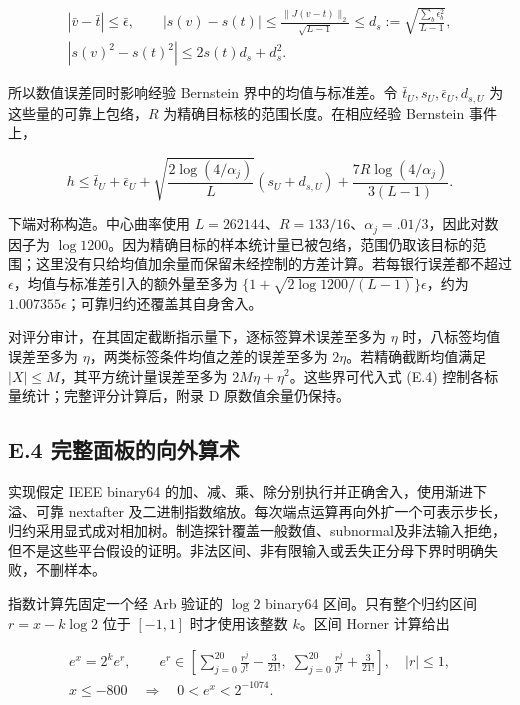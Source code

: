 \documentclass[11pt,a4paper]{article}
\begin{document}
\[
\begin{gathered}
|\bar v-\bar t|\le\bar\epsilon,\qquad
|s(v)-s(t)|\le\frac{\|J(v-t)\|_2}{\sqrt{L-1}}
\le d_s:=\sqrt{\frac{\sum_b\epsilon_b^2}{L-1}},\\
|s(v)^2-s(t)^2|\le2s(t)d_s+d_s^2.
\end{gathered}
\tag{E.4}
\]

所以数值误差同时影响经验 Bernstein 界中的均值与标准差。令
\(\bar t_U,s_U,\bar\epsilon_U,d_{s,U}\) 为这些量的可靠上包络，\(R\)
为精确目标核的范围长度。在相应经验 Bernstein 事件上，

\[
h\le\bar t_U+\bar\epsilon_U
+\sqrt{\frac{2\log(4/\alpha_j)}L}(s_U+d_{s,U})
+\frac{7R\log(4/\alpha_j)}{3(L-1)}.
\tag{E.5}
\]

下端对称构造。中心曲率使用
\(L=262144\)、\(R=133/16\)、\(\alpha_j=.01/3\)，因此对数因子为
\(\log1200\)。因为精确目标的样本统计量已被包络，范围仍取该目标的范围；这里没有只给均值加余量而保留未经控制的方差计算。若每银行误差都不超过
\(\epsilon\)，均值与标准差引入的额外量至多为
\(\{1+\sqrt{2\log1200/(L-1)}\}\epsilon\)，约为
\(1.007355\epsilon\)；可靠归约还覆盖其自身舍入。

对评分审计，在其固定截断指示量下，逐标签算术误差至多为 \(\eta\)
时，八标签均值误差至多为 \(\eta\)，两类标签条件均值之差的误差至多为
\(2\eta\)。若精确截断均值满足 \(|X|\le M\)，其平方统计量误差至多为
\(2M\eta+\eta^2\)。这些界可代入式 (E.4)
控制各标量统计；完整评分计算后，附录 D 原数值余量仍保持。

\subsection*{E.4
完整面板的向外算术}\label{e.4-ux5b8cux6574ux9762ux677fux7684ux5411ux5916ux7b97ux672f}

实现假定 IEEE binary64
的加、减、乘、除分别执行并正确舍入，使用渐进下溢、可靠 nextafter
及二进制指数缩放。每次端点运算再向外扩一个可表示步长，归约采用显式成对相加树。制造探针覆盖一般数值、subnormal及非法输入拒绝，但不是这些平台假设的证明。非法区间、非有限输入或丢失正分母下界时明确失败，不删样本。

指数计算先固定一个经 Arb 验证的 \(\log2\) binary64
区间。只有整个归约区间 \(r=x-k\log2\) 位于 \([-1,1]\) 时才使用该整数
\(k\)。区间 Horner 计算给出

\[
\begin{gathered}
e^x=2^ke^r,\qquad
e^r\in\left[\sum_{j=0}^{20}\frac{r^j}{j!}-\frac3{21!},\;
\sum_{j=0}^{20}\frac{r^j}{j!}+\frac3{21!}\right],\quad |r|\le1,\\
x\le-800\quad\Longrightarrow\quad 0<e^x<2^{-1074}.
\end{gathered}
\tag{E.6}
\]
\end{document}
